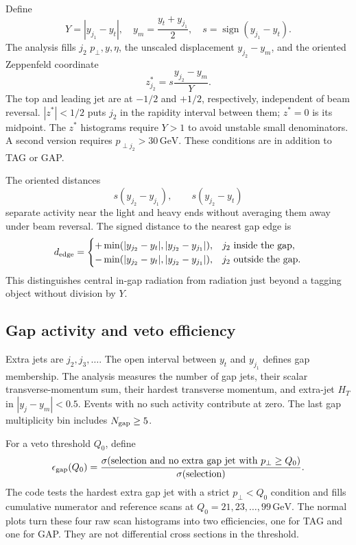 \documentclass[11pt,a4paper]{article}
\newcommand{\GeV}{\,\mathrm{GeV}}
\begin{document}
Define
\begin{equation}
 Y=|y_{j_1}-y_t|,\quad
 y_m=\frac{y_t+y_{j_1}}2,\quad
 s=\operatorname{sign}(y_{j_1}-y_t).
\end{equation}
The analysis fills $j_2$ $p_\perp,y,\eta$, the unscaled displacement
$y_{j_2}-y_m$, and the oriented Zeppenfeld coordinate
\begin{equation}
 z^*_{j_2}=s\frac{y_{j_2}-y_m}{Y}.\label{eq:zstar}
\end{equation}
The top and leading jet are at $-1/2$ and $+1/2$, respectively, independent
of beam reversal. $|z^*|<1/2$ puts $j_2$ in the rapidity interval between
them; $z^*=0$ is its midpoint. The $z^*$ histograms require $Y>1$ to avoid
unstable small denominators. A second version requires
$p_{\perp j_2}>30\GeV$. These conditions are in addition to TAG or GAP.

The oriented distances
\begin{equation}
 s(y_{j_2}-y_{j_1}),\qquad s(y_{j_2}-y_t)
\end{equation}
separate activity near the light and heavy ends without averaging them away
under beam reversal. The signed distance to the nearest gap edge is
\begin{equation}
 d_{\rm edge}=\begin{cases}
 +\min(|y_{j_2}-y_t|,|y_{j_2}-y_{j_1}|),&j_2\text{ inside the gap},\\
 -\min(|y_{j_2}-y_t|,|y_{j_2}-y_{j_1}|),&j_2\text{ outside the gap}.
 \end{cases}
\end{equation}
This distinguishes central in-gap radiation from radiation just beyond a
tagging object without division by $Y$.

\subsection{Gap activity and veto efficiency}

Extra jets are $j_2,j_3,\ldots$. The open interval between $y_t$ and
$y_{j_1}$ defines gap membership. The analysis measures the number of gap
jets, their scalar transverse-momentum sum, their hardest transverse
momentum, and extra-jet $H_T$ in $|y_j-y_m|<0.5$. Events with no such activity
contribute at zero. The last gap multiplicity bin includes $N_{\rm gap}\geq5$.

For a veto threshold $Q_0$, define
\begin{equation}
 \epsilon_{\rm gap}(Q_0)
 =\frac{\sigma(\text{selection and no extra gap jet with }p_\perp\geq Q_0)}
        {\sigma(\text{selection})}.
\end{equation}
The code tests the hardest extra gap jet with a strict $p_\perp<Q_0$
condition and fills cumulative numerator and reference scans at
$Q_0=21,23,\ldots,99\GeV$. The normal plots turn these four raw scan
histograms into two efficiencies, one for TAG and one for GAP. They are
not differential cross sections in the threshold.
\end{document}
